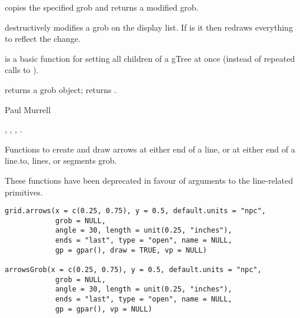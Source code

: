 %
\begin{Details}\relax
{} copies the specified grob and returns a modified
grob.

 destructively modifies a grob on the display list.
If 
is  it then redraws everything to reflect the change.

 is a basic function for setting all children
of a gTree at once (instead of repeated calls to ).
\end{Details}
%
\begin{Value}
 returns a grob object;   returns .
\end{Value}
%
\begin{Author}\relax
Paul Murrell
\end{Author}
%
\begin{SeeAlso}\relax
{}, ,
, .
\end{SeeAlso}
%
\begin{Description}\relax
Functions to create and draw arrows at either end of a line, or at
either end of a 
line.to, lines, or segments grob.

These functions have been deprecated in favour of 
arguments to the line-related primitives.
\end{Description}
%
\begin{Usage}
\begin{verbatim}
grid.arrows(x = c(0.25, 0.75), y = 0.5, default.units = "npc",
            grob = NULL,
            angle = 30, length = unit(0.25, "inches"),
            ends = "last", type = "open", name = NULL,
            gp = gpar(), draw = TRUE, vp = NULL)

arrowsGrob(x = c(0.25, 0.75), y = 0.5, default.units = "npc",
            grob = NULL,
            angle = 30, length = unit(0.25, "inches"),
            ends = "last", type = "open", name = NULL,
            gp = gpar(), vp = NULL)
\end{verbatim}
\end{Usage}
%
